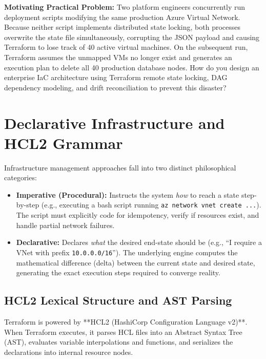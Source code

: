 \begin{chaptergoalsbox}
\textbf{Motivating Practical Problem:}
Two platform engineers concurrently run deployment scripts modifying the same production Azure Virtual Network. Because neither script implements distributed state locking, both processes overwrite the state file simultaneously, corrupting the JSON payload and causing Terraform to lose track of 40 active virtual machines. On the subsequent run, Terraform assumes the unmapped VMs no longer exist and generates an execution plan to delete all 40 production database nodes. How do you design an enterprise IaC architecture using Terraform remote state locking, DAG dependency modeling, and drift reconciliation to prevent this disaster?
\end{chaptergoalsbox}

\section{Declarative Infrastructure and HCL2 Grammar}

Infrastructure management approaches fall into two distinct philosophical categories:
\begin{itemize}[leftmargin=12pt]
  \item \textbf{Imperative (Procedural):} Instructs the system \emph{how} to reach a state step-by-step (e.g., executing a bash script running \texttt{az network vnet create ...}). The script must explicitly code for idempotency, verify if resources exist, and handle partial network failures.
  \item \textbf{Declarative:} Declares \emph{what} the desired end-state should be (e.g., ``I require a VNet with prefix \texttt{10.0.0.0/16}''). The underlying engine computes the mathematical difference (delta) between the current state and desired state, generating the exact execution steps required to converge reality.
\end{itemize}

\subsection{HCL2 Lexical Structure and AST Parsing}
Terraform is powered by **HCL2 (HashiCorp Configuration Language v2)**. When Terraform executes, it parses HCL files into an Abstract Syntax Tree (AST), evaluates variable interpolations and functions, and serializes the declarations into internal resource nodes.

